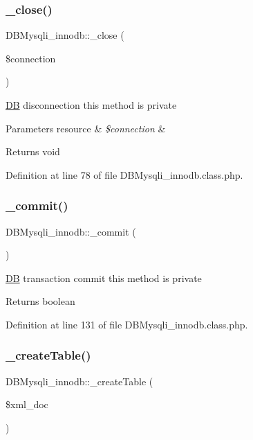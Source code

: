 \subsubsection{\texorpdfstring{\+\_\+close()}{\_close()}}
{\footnotesize\ttfamily D\+B\+Mysqli\+\_\+innodb\+::\+\_\+close (\begin{DoxyParamCaption}\item[{}]{\$connection }\end{DoxyParamCaption})}

\hyperlink{classDB}{DB} disconnection this method is private 
\begin{DoxyParams}[1]{Parameters}
resource & {\em \$connection} & \\
\hline
\end{DoxyParams}
\begin{DoxyReturn}{Returns}
void 
\end{DoxyReturn}


Definition at line 78 of file D\+B\+Mysqli\+\_\+innodb.\+class.\+php.

\hypertarget{classDBMysqli__innodb_a0ec5faa054822bd226fa6c404b17e674}{}\label{classDBMysqli__innodb_a0ec5faa054822bd226fa6c404b17e674} 
\subsubsection{\texorpdfstring{\+\_\+commit()}{\_commit()}}
{\footnotesize\ttfamily D\+B\+Mysqli\+\_\+innodb\+::\+\_\+commit (\begin{DoxyParamCaption}{ }\end{DoxyParamCaption})}

\hyperlink{classDB}{DB} transaction commit this method is private \begin{DoxyReturn}{Returns}
boolean 
\end{DoxyReturn}


Definition at line 131 of file D\+B\+Mysqli\+\_\+innodb.\+class.\+php.

\hypertarget{classDBMysqli__innodb_adea880ad43bc281fbdae806bd25d6cce}{}\label{classDBMysqli__innodb_adea880ad43bc281fbdae806bd25d6cce} 
\subsubsection{\texorpdfstring{\+\_\+create\+Table()}{\_createTable()}}
{\footnotesize\ttfamily D\+B\+Mysqli\+\_\+innodb\+::\+\_\+create\+Table (\begin{DoxyParamCaption}\item[{}]{\$xml\+\_\+doc }\end{DoxyParamCaption})}

